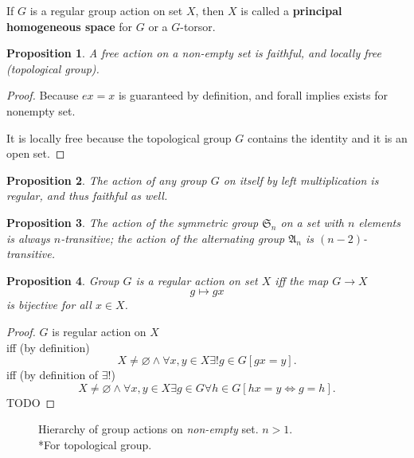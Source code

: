\documentclass[12pt, letterpaper]{article}
\newcommand{\red}[1]{{\color{red} #1}}
\renewcommand{\emptyset}{\varnothing}
\newtheorem{prop}{Proposition}[section]
\theoremstyle{definition}
\theoremstyle{remark}
\theoremstyle{definition}
\theoremstyle{plain}
\numberwithin{equation}{section}
\begin{document}
	\begin{def*}
		If $G$ is a regular group action on set $X$, then
		$X$ is called a \textbf{principal homogeneous space} for $G$ or a $G$-torsor.
	\end{def*}

	\begin{prop}
		A free action on a non-empty set is faithful, and locally free (topological group).
	\end{prop}
	\begin{proof}
		Because $ex=x$ is guaranteed by definition, and forall implies exists for nonempty set.
		
		It is locally free because the topological group $G$ contains the identity and it is an open set.
	\end{proof}

	\begin{prop}
		The action of any group $G$ on itself by left multiplication is regular, and thus faithful as well.
	\end{prop}

	\begin{prop}
		The action of the symmetric group $\mathfrak{S}_n$ on a set with $n$ elements is always $n$-transitive;
 		the action of the alternating group $\mathfrak{A}_n$  is $(n - 2)$-transitive.
	\end{prop}

	\begin{prop}\label{propRegularActionBijection}
		Group $G$ is a regular action on set $X$ iff the map $G\to X$
		\[ g\mapsto gx \]
		is bijective for all $x\in X$.
	\end{prop}
	\begin{proof}
		$G$ is regular action on $X$\\
		iff (by definition)
		\[ X\ne \emptyset\land \forall x,y\in X \exists! g\in G[gx=y]. \]
		iff (by definition of $\exists!$)
		\[ X\ne \emptyset\land \forall x,y\in X \exists g\in G\forall h\in G[hx=y\iff g=h]. \]
		\red{TODO}
	\end{proof}

	\begin{figure}[H]
		\centering
		\caption{Hierarchy of group actions on \textit{non-empty} set. $n>1$.\\
		*For topological group.}
		\label{fig:group_actions}
	\end{figure}	
\end{document}
